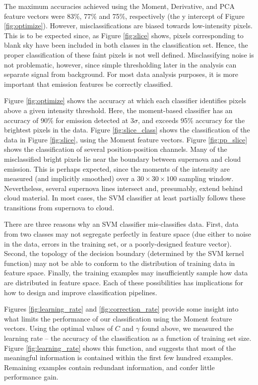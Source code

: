 The maximum accuracies achieved using the Moment, Derivative, and PCA feature vectors were 83\%, 77\% and 75\%, respectively (the y intercept of Figure \ref{fig:optimize}). However, misclassifications are biased towards low-intensity pixels. This is to be expected since, as Figure \ref{fig:slice} shows, pixels corresponding to blank sky have been included in both classes in the classification set. Hence, the proper classification of these faint pixels is not well defined. Misclassifying noise is not problematic, however, since simple thresholding later in the analysis can separate signal from background. For most data analysis purposes, it is more important that emission features be correctly classified.

Figure \ref{fig:optimize} shows the accuracy at which each classifier identifies pixels above a given intensity threshold. Here, the moment-based classifier has an accuracy of 90\% for emission detected at 3$\sigma$, and exceeds 95\% accuracy for the brightest pixels in the data. Figure \ref{fig:slice_class} shows the classification of the data in Figure \ref{fig:slice}, using the Moment feature vectors. Figure \ref{fig:pp_slice} shows the classification of several position-position channels. Many of the misclassified bright pixels lie near the boundary between supernova and cloud emission. This is perhaps expected, since the moments of the intensity are measured (and implicitly smoothed) over a $30\times30\times100$ sampling window. Nevertheless, several supernova lines intersect and, presumably, extend behind cloud material. In most cases, the SVM classifier at least partially follows these transitions from supernova to cloud.

There are three reasons why an SVM classifier mis-classifies data. First, data from two classes may not segregate perfectly in feature space (due either to noise in the data, errors in the training set, or a poorly-designed feature vector). Second,  the topology of the decision boundary (determined by the SVM kernel function) may not be able to conform to the distribution of training data in feature space. Finally, the training examples may insufficiently sample how data are distributed in feature space. Each of these possibilities has implications for how to design and improve classification pipelines.

Figures \ref{fig:learning_rate} and \ref{fig:correction_rate} provide some insight into what limits the performance of our classification using the Moment feature vectors. Using the optimal values of $C$ and $\gamma$ found above, we measured the learning rate -- the accuracy of the classification as a function of training set size. Figure \ref{fig:learning_rate} shows this function, and suggests that most of the meaningful information is contained within the first few hundred examples. Remaining examples contain redundant information, and confer little performance gain.


